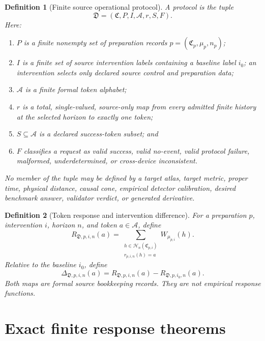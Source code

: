 \documentclass[11pt]{article}
\newtheorem{definition}{Definition}
\newcommand{\Device}{\mathfrak D}
\newcommand{\Control}{\mathfrak C}
\newcommand{\Hist}{\mathcal H}
\newcommand{\Tokens}{\mathcal A}
\newcommand{\Response}{R}
\newcommand{\Difference}{\Delta}
\begin{document}
\begin{definition}[Finite source operational protocol]
A protocol is the tuple
\[
  \Device=(\Control,P,I,\Tokens,r,S,F).
\]
Here:
\begin{enumerate}[leftmargin=*]
\item \(P\) is a finite nonempty set of preparation records
  \(p=(\Control_p,\mu_p,n_p)\);
\item \(I\) is a finite set of source intervention labels containing a
  baseline label \(i_0\); an intervention selects only declared source
  control and preparation data;
\item \(\Tokens\) is a finite formal token alphabet;
\item \(r\) is a total, single-valued, source-only map from every admitted
  finite history at the selected horizon to exactly one token;
\item \(S\subseteq\Tokens\) is a declared success-token subset; and
\item \(F\) classifies a request as valid success, valid no-event, valid
  protocol failure, malformed, underdetermined, or cross-device inconsistent.
\end{enumerate}
No member of the tuple may be defined by a target atlas, target metric,
proper time, physical distance, causal cone, empirical detector calibration,
desired benchmark answer, validator verdict, or generated derivative.
\end{definition}

\begin{definition}[Token response and intervention difference]
For a preparation \(p\), intervention \(i\), horizon \(n\), and token
\(a\in\Tokens\), define
\begin{equation}
  \Response_{\Device,p,i,n}(a)
  =
  \sum_{\substack{h\in\Hist_n(\Control_{p,i})\\r_{p,i,n}(h)=a}}
  W_{\mu_{p,i}}(h).
  \label{eq:response}
\end{equation}
Relative to the baseline \(i_0\), define
\begin{equation}
  \Difference_{\Device,p,i,n}(a)
  =
  \Response_{\Device,p,i,n}(a)
  -
  \Response_{\Device,p,i_0,n}(a).
  \label{eq:difference}
\end{equation}
Both maps are formal source bookkeeping records. They are not empirical
response functions.
\end{definition}

\section{Exact finite response theorems}
\end{document}
